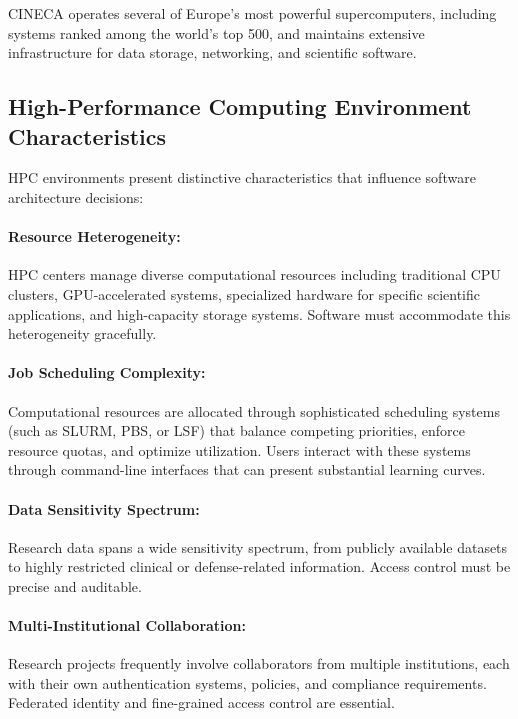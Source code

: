 \documentclass[a4paper,twoside]{sapthesis}
\begin{document}
CINECA operates several of Europe's most powerful supercomputers, including systems ranked among the world's top 500, and maintains extensive infrastructure for data storage, networking, and scientific software.

\subsection{High-Performance Computing Environment Characteristics}

HPC environments present distinctive characteristics that influence software architecture decisions:

\paragraph{Resource Heterogeneity:}
HPC centers manage diverse computational resources including traditional CPU clusters, GPU-accelerated systems, specialized hardware for specific scientific applications, and high-capacity storage systems. Software must accommodate this heterogeneity gracefully.

\paragraph{Job Scheduling Complexity:}
Computational resources are allocated through sophisticated scheduling systems (such as SLURM, PBS, or LSF) that balance competing priorities, enforce resource quotas, and optimize utilization. Users interact with these systems through command-line interfaces that can present substantial learning curves.

\paragraph{Data Sensitivity Spectrum:}
Research data spans a wide sensitivity spectrum, from publicly available datasets to highly restricted clinical or defense-related information. Access control must be precise and auditable.

\paragraph{Multi-Institutional Collaboration:}
Research projects frequently involve collaborators from multiple institutions, each with their own authentication systems, policies, and compliance requirements. Federated identity and fine-grained access control are essential.
\end{document}

